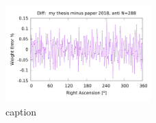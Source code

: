 \begin{figure}[H]
	\centering
	\includegraphics[width=0.5\textwidth]{anti_my_and_paper_in_288_error.png}
	\caption{caption}
	\label{fig:error_288_anti}
\end{figure}


